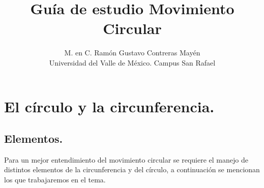 \documentclass[14pt]{extarticle}
\title{\vspace*{-2cm} Guía de estudio Movimiento Circular}
\author{M. en C. Ramón Gustavo Contreras Mayén \\ {\fontsize{14}{14}\selectfont Universidad del Valle de México. Campus San Rafael}}
\date{}
\begin{document}
\maketitle

\section{El círculo y la circunferencia.}
\subsection{Elementos.}

Para un mejor entendimiento del movimiento circular se requiere el manejo de distintos elementos de la circunferencia y del círculo, a continuación se mencionan los que trabajaremos en el tema.
\end{document}
